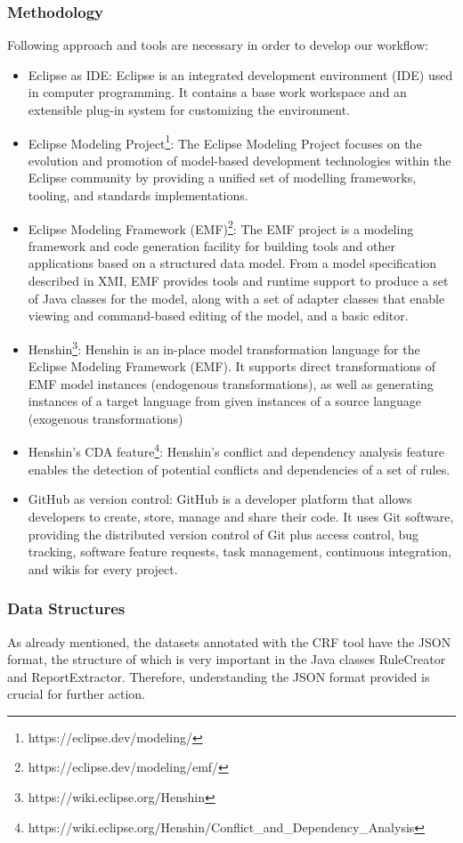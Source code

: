 \subsubsection*{Methodology}
Following approach and tools are necessary in order to develop our workflow:
\begin{itemize}
	\item Eclipse as IDE: Eclipse is an integrated development environment (IDE) used in computer programming. It contains a base work workspace and an extensible plug-in system for customizing the environment.
	\item Eclipse Modeling Project\footnote{https://eclipse.dev/modeling/}: The Eclipse Modeling Project focuses on the evolution and promotion of model-based development technologies within the Eclipse community by providing a unified set of modelling frameworks, tooling, and standards implementations.
	\item Eclipse Modeling Framework (EMF)\footnote{https://eclipse.dev/modeling/emf/}: The EMF project is a modeling framework and code generation facility for building tools and other applications based on a structured data model. From a model specification described in XMI, EMF provides tools and runtime support to produce a set of Java classes for the model, along with a set of adapter classes that enable viewing and command-based editing of the model, and a basic editor.
	\item Henshin\footnote{https://wiki.eclipse.org/Henshin}: Henshin is an in-place model transformation language for the Eclipse Modeling Framework (EMF). It supports direct transformations of EMF model instances (endogenous transformations), as well as generating instances of a target language from given instances of a source language (exogenous transformations)
	\item Henshin's CDA feature\footnote{https://wiki.eclipse.org/Henshin/Conflict\_and\_Dependency\_Analysis}: Henshin's conflict and dependency analysis feature enables the detection of potential conflicts and dependencies of a set of rules.
	\item GitHub as version control: GitHub is a developer platform that allows developers to create, store, manage and share their code. It uses Git software, providing the distributed version control of Git plus access control, bug tracking, software feature requests, task management, continuous integration, and wikis for every project.
\end{itemize} 
\subsubsection*{Data Structures}
As already mentioned, the datasets annotated with the CRF tool have the JSON format, the structure of which is very important in the Java classes RuleCreator and ReportExtractor. Therefore, understanding the JSON format provided is crucial for further action.

